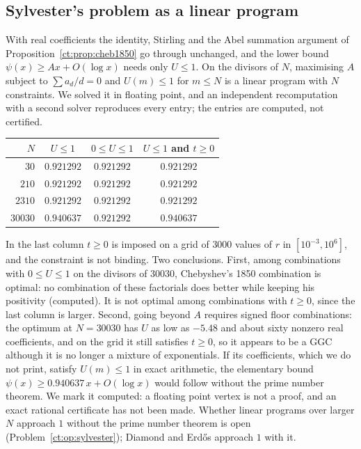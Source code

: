 \subsection{Sylvester's problem as a linear program}
With real coefficients the identity, Stirling and the Abel summation argument of Proposition~\ref{ct:prop:cheb1850} go through unchanged, and the lower bound $\psi(x)\ge Ax+O(\log x)$ needs only $U\le1$. On the divisors of $N$, maximising $A$ subject to $\sum a_d/d=0$ and $U(m)\le1$ for $m\le N$ is a linear program with $N$ constraints. We solved it in floating point, and an independent recomputation with a second solver reproduces every entry; the entries are computed, not certified.
\begin{center}
\small
\begin{tabular}{rccc}
\toprule
$N$ & $U\le1$ & $0\le U\le1$ & $U\le1$ and $t\ge0$\\
\midrule
$30$ & $0.921292$ & $0.921292$ & $0.921292$\\
$210$ & $0.921292$ & $0.921292$ & $0.921292$\\
$2310$ & $0.921292$ & $0.921292$ & $0.921292$\\
$30030$ & $0.940637$ & $0.921292$ & $0.940637$\\
\bottomrule
\end{tabular}
\end{center}
In the last column $t\ge0$ is imposed on a grid of $3000$ values of $r$ in $[10^{-3},10^6]$, and the constraint is not binding. Two conclusions. First, among combinations with $0\le U\le1$ on the divisors of $30030$, Chebyshev's 1850 combination is optimal: no combination of these factorials does better while keeping his positivity (computed). It is not optimal among combinations with $t\ge0$, since the last column is larger. Second, going beyond $A$ requires signed floor combinations: the optimum at $N=30030$ has $U$ as low as $-5.48$ and about sixty nonzero real coefficients, and on the grid it still satisfies $t\ge0$, so it appears to be a GGC although it is no longer a mixture of exponentials. If its coefficients, which we do not print, satisfy $U(m)\le1$ in exact arithmetic, the elementary bound $\psi(x)\ge0.940637\,x+O(\log x)$ would follow without the prime number theorem. We mark it computed: a floating point vertex is not a proof, and an exact rational certificate has not been made. Whether linear programs over larger $N$ approach $1$ without the prime number theorem is open (Problem~\ref{ct:op:sylvester}); Diamond and Erd\H{o}s approach $1$ with it.

